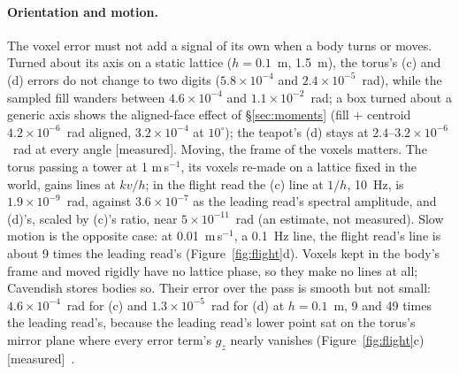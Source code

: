 \documentclass[10pt,a4paper]{article}
\newcommand{\provisional}{\textcolor{orange!70!black}{\textsf{\small[provisional --- research scripts; TASK-S5-29 regenerates this with Cavendish]}}}
\newcommand{\tagM}{\textsf{\small[measured]}}
\begin{document}
\begin{table}[tbp]\centering\scriptsize
\caption{Distance from the surface (m) beyond which each technique's phase error stays below
$10^{-6}$ / $10^{-10}$~rad (--- never, within 1000 body sizes): grid points of an 18-point log grid
from 0.5~m (ratio 1.56), so ``0.5'' means at the nearest point run. (e) is below both everywhere;
(a) never reaches $10^{-10}$~rad. Bodies 1~m across except the sphere (2~m) and torus (2.8~m). Static
flight-integral read. \tagM, \texttt{paper-real-read/tables-regimes.md}. \provisional}
\label{tab:regimes}
\setlength{\tabcolsep}{3pt}
\resizebox{\linewidth}{!}{}
\end{table}

\paragraph{Orientation and motion.} The voxel error must not add a signal of its own when a body turns
or moves. Turned about its axis on a static lattice ($h = 0.1$~m, 1.5~m), the torus's (c) and (d)
errors do not change to two digits ($5.8\times10^{-4}$ and $2.4\times10^{-5}$~rad), while the sampled
fill wanders between $4.6\times10^{-4}$ and $1.1\times10^{-2}$~rad; a box turned about a generic
axis shows the aligned-face effect of \S\ref{sec:moments} (fill + centroid $4.2\times10^{-6}$~rad
aligned, $3.2\times10^{-4}$ at $10^\circ$); the teapot's (d) stays at
$2.4$--$3.2\times10^{-6}$~rad at every angle \tagM. Moving, the frame of the voxels matters. The torus
passing a tower at 1 m\,s$^{-1}$, its voxels re-made on a lattice fixed in the world, gains lines at
$kv/h$; in the flight read the (c) line at $1/h$, 10~Hz, is $1.9\times10^{-9}$~rad, against
$3.6\times10^{-7}$ as the leading read's spectral amplitude, and (d)'s, scaled by (c)'s ratio,
near $5\times10^{-11}$~rad (an estimate, not measured). Slow motion is the opposite case: at
0.01~m\,s$^{-1}$, a 0.1~Hz line, the flight read's line is about 9 times the leading read's
(Figure~\ref{fig:flight}d). Voxels kept in the body's frame and moved rigidly have no lattice phase,
so they make no lines at all; Cavendish stores bodies so. Their error over the pass is smooth but not
small: $4.6\times10^{-4}$~rad for (c) and $1.3\times10^{-5}$~rad for (d) at $h=0.1$~m, 9 and 49 times
the leading read's, because the leading read's lower point sat on the torus's mirror plane where every
error term's $g_z$ nearly vanishes (Figure~\ref{fig:flight}c) \tagM\ \citep[\S3.3--3.4]{paperflight}.
\end{document}
